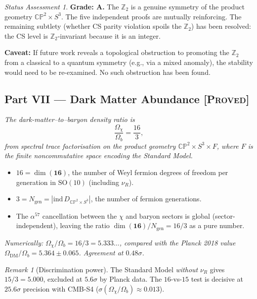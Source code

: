 \documentclass[11pt]{article}
\theoremstyle{definition}
\theoremstyle{remark}
\newtheorem*{remark}{Remark}
\newtheorem*{status}{Status Assessment}
\newcommand{\CP}{\mathbb{CP}}
\begin{document}
\begin{status}
\textbf{Grade: A.}  The $\mathbb{Z}_2$ is a genuine symmetry of the
product geometry $\CP^2 \times S^3$.  The five independent proofs
are mutually reinforcing.  The remaining subtlety (whether CS
parity violation spoils the $\mathbb{Z}_2$) has been resolved:
the CS level is $\mathbb{Z}_2$-invariant because it is an integer.

\textbf{Caveat:} If future work reveals a topological obstruction to
promoting the $\mathbb{Z}_2$ from a classical to a quantum symmetry
(e.g., via a mixed anomaly), the stability would need to be
re-examined.  No such obstruction has been found.
\end{status}


\subsection*{Part VII --- Dark Matter Abundance%
\hfill\normalfont\textsc{[Proved]}}

\textit{The dark-matter--to--baryon density ratio is}
\begin{equation}\label{eq:ratio}
  \frac{\Omega_\chi}{\Omega_b} = \frac{16}{3},
\end{equation}
\textit{from spectral trace factorisation on the product geometry
$\CP^2 \times S^3 \times F$, where $F$ is the finite noncommutative
space encoding the Standard Model.}

\begin{itemize}
\item $16 = \dim(\mathbf{16})$, the number of Weyl fermion degrees of
  freedom per generation in $\mathrm{SO}(10)$ (including $\nu_R$).
\item $3 = N_{\mathrm{gen}} = |\mathrm{ind}\,D_{\CP^2 \times S^3}|$,
  the number of fermion generations.
\item The $\alpha^{57}$ cancellation between the $\chi$ and baryon
  sectors is global (sector-independent), leaving the ratio
  $\dim(\mathbf{16})/N_{\mathrm{gen}} = 16/3$ as a pure number.
\end{itemize}

\textit{Numerically: $\Omega_\chi/\Omega_b = 16/3 = 5.333\ldots$,
compared with the Planck 2018 value
$\Omega_{\mathrm{DM}}/\Omega_b = 5.364 \pm 0.065$.
Agreement at $0.48\sigma$.}

\begin{remark}[Discrimination power]
The Standard Model \emph{without} $\nu_R$ gives
$15/3 = 5.000$, excluded at $5.6\sigma$ by Planck data.  The
$16$-vs-$15$ test is decisive at $25.6\sigma$ precision with
CMB-S4 ($\sigma(\Omega_\chi/\Omega_b) \approx 0.013$).
\end{remark}
\end{document}
